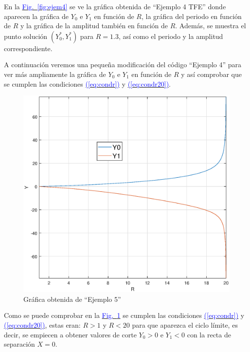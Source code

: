 \documentclass[12pt,a4paper]{report} %
\newcommand{\fref}[1]{\hyperref[#1]{\textcolor{blue}{Fig.~\ref*{#1}}}}
\newcommand{\eref}[1]{\hyperref[#1]{\textcolor{blue}{(\ref*{#1})}}}
\newcommand{\fref}[1]{\hyperref[#1]{\textcolor{blue}{\textit{Fig.~\ref*{#1}}}}}
\newcommand{\eref}[1]{\hyperref[#1]{\textcolor{blue}{\textit{(\ref*{#1})}}}}
\begin{document}
	\vspace{0.5cm}\noindent En la \fref{fig:ejem4} se ve la gráfica obtenida de ``Ejemplo 4 TFE'' donde aparecen la gráfica de $Y_0$ e $Y_1$ en función de $R$, la gráfica del periodo en función de $R$ y la gráfica de la amplitud también en función de $R$. Además, se muestra el punto solución $(Y_0^*,Y_1^*)$ para $R=1.3$, así como el periodo y la amplitud correspondiente.
	
	\newpage
	
	\vspace{0.5cm} A continuación veremos una pequeña modificación del código ``Ejemplo 4'' para ver más ampliamente la gráfica de $Y_0$ e $Y_1$ en función de $R$ y así comprobar que se cumplen las condiciones \eref{eq:condr} y \eref{eq:condr20}.
	
	
	\vspace{1cm}
	
	\newpage
	
	\begin{figure}[h]
		\centering
		\includegraphics[width=1\textwidth]{ejem5nuevo.eps}
		\caption{Gráfica obtenida de ``Ejemplo 5''}
		\label{fig:ry1ry0}
	\end{figure}\smallskip
	
	\vspace{0.5cm}\noindent Como se puede comprobar en la \fref{fig:ry1ry0} se cumplen las condiciones \eref{eq:condr} y \eref{eq:condr20}, estas eran: $R>1$ y $R<20$ para que aparezca el ciclo límite, es decir, se empiecen a obtener valores de corte $Y_0>0$ e $Y_1<0$ con la recta de separación $X=0$.
	
\end{document}
